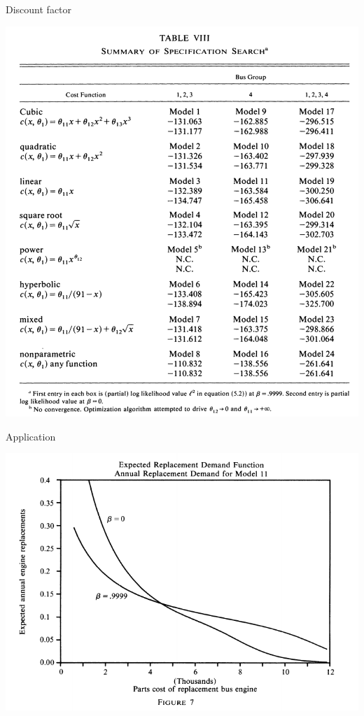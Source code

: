 \documentclass[xcolor=pdftex,dvipsnames,table,mathserif,aspectratio=169]{beamer}
\begin{document}
\begin{frame}{Discount factor}
\begin{center}
\includegraphics[scale=.25]{./resources/RustT8.png}
\end{center}
\end{frame}

\begin{frame}{Application}
\begin{center}
\includegraphics[scale=.8]{./resources/RustF7.pdf}
\end{center}
\end{frame}
\end{document}
